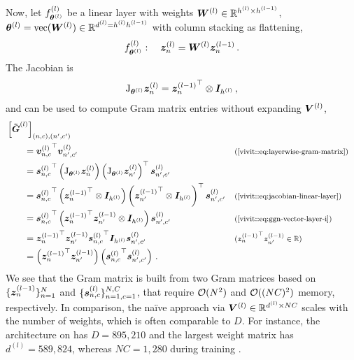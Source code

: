 Now, let $f^{(l)}_{{\bm{\theta}}^{(l)}}$ be a linear layer with weights ${\bm{W}}^{(l)} \in
{\mathbb{R}}^{h^{(l)}\times h^{(l-1)}}$, \ie ${\bm{\theta}}^{(l)} = \mathrm{vec}({\bm{W}}^{(l)}) \in
{\mathbb{R}}^{d^{(l)} = h^{(l)} h^{(l-1)}}$ with column stacking as flattening,
\begin{align*}
  f^{(l)}_{{\bm{\theta}}^{(l)}}:\quad {\bm{z}}_n^{(l)} = {\bm{W}}^{(l)} {\bm{z}}_n^{(l-1)}\,.
\end{align*}
The Jacobian is
\begin{align}
  \label{vivit::eq:jacobian-linear-layer}
  \mathrm{J}_{{\bm{\theta}}^{(l)}} {\bm{z}}_n^{(l)}
  =
  {{\bm{z}}_n^{(l-1)}}^\top \otimes {\bm{I}}_{h^{(l)}}\,,
\end{align}
and can be used to compute Gram matrix entries without expanding ${\bm{V}}^{(l)}$,
\begin{align*}
  &\left[ \mGtilde^{(l)}\right]_{(n,c),(n',c')}
  \\
  &\qquad =
    {\vv_{n,c}^{(l)}}^\top\vv_{n',c'}^{(l)}
    \explainmath{(\Cref{vivit::eq:layerwise-gram-matrix})}
    \\
  &\qquad =
    {\vs^{(l)}_{n,c}}^\top
    \left( \jac_{\vtheta^{(l)}} \vz_n^{(l)} \right)
    \left( \jac_{\vtheta^{(l)}} \vz_{n'}^{(l)} \right)^\top
    {\vs^{(l)}_{n',c'}}
  \\
  &\qquad =
    {\vs^{(l)}_{n,c}}^\top
    \left( {\vz_n^{(l-1)}}^\top \otimes \mI_{h^{(l)}}\right)
    \left( {\vz_{n'}^{(l-1)}}^\top \otimes \mI_{h^{(l)}} \right)^\top
    {\vs^{(l)}_{n',c'}}
    \explainmath{(\Cref{vivit::eq:jacobian-linear-layer})}
    \\
  &\qquad =
    {\vs^{(l)}_{n,c}}^\top
    \left( {\vz_n^{(l-1)}}^\top \vz_{n'}^{(l-1)} \otimes \mI_{h^{(l)}}\right)
    \vs^{(l)}_{n',c'}
    \explainmath{(\Cref{vivit::eq:ggn-vector-layer-i})}
  \\
  &\qquad =
    { \vz_n^{(l-1)}}^\top \vz_{n'}^{(l-1)} {\vs^{(l)}_{n,c}}^\top
     \mI_{h^{(l)}} \vs^{(l)}_{n',c'}
    \explainmath{(${\vz_n^{(l-1)}}^\top \vz_{n'}^{(l-1)}\in \sR$)}
  \\
  &\qquad =
    \left(  { \vz_n^{(l-1)}}^\top \vz_{n'}^{(l-1)}\right)
    \left( {\vs^{(l)}_{n,c}}^\top \vs^{(l)}_{n',c'} \right)\,.
\end{align*}
We see that the Gram matrix is built from two Gram matrices based on $\{
{\bm{z}}_n^{(l-1)}\}_{n=1}^N$ and $\{{\bm{s}}_{n,c}^{(l)}\}_{n=1,c=1}^{N,C}$, that require
${\mathcal{O}}(N^2)$ and ${\mathcal{O}}((NC)^2)$ memory, respectively. In comparison, the na\"ive
approach via ${\bm{V}}^{(l)} \in {\mathbb{R}}^{d^{(l)} \times N C}$ scales with the number of
weights, which is often comparable to $D$. For instance, the \threecthreed
architecture on \cifarten has $D=895,\!210$ and the largest weight matrix has
$d^{(l)}=589,\!824$, whereas $N C = 1,\!280$ during training
\citep{schneider2019deepobs}.

